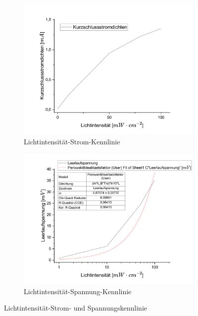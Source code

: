 \documentclass[12pt,a4paper,ngerman]{report}
\begin{document}
\begin{figure}[ht]
	\centering
	\begin{subfigure}[b]{0.45\textwidth}
		\centering
		\includegraphics[width=\textwidth]{bilder/Licht_Strom.pdf}
		\caption{Lichtintensität-Strom-Kennlinie}
		\label{fig:LichtStrom}
	\end{subfigure}
	\hfill
	\begin{subfigure}[b]{0.45\textwidth}
		\centering
		\includegraphics[width=\textwidth]{bilder/Licht_Spannung.pdf}
		\caption{Lichtintensität-Spannung-Kennlinie}
		\label{fig:LichtSpannung}
	\end{subfigure}
	\caption[Tauc-Plots]{Lichtintensität-Strom- und Spannungskennlinie}
	\label{fig:LichtKennlinien}
\end{figure}
\end{document}
